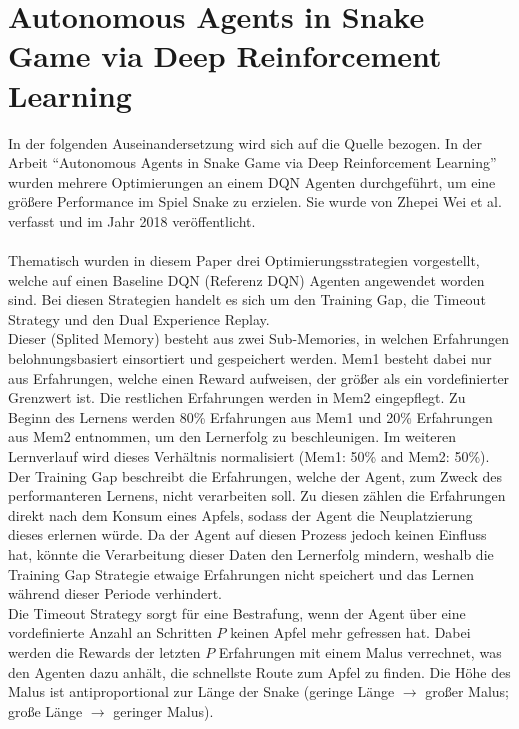 \section{Autonomous Agents in Snake Game via Deep Reinforcement Learning} \label{sec:Verwandte_Arbeiten_Paper_1}
In der folgenden Auseinandersetzung wird sich auf die Quelle \cite{Autonomous_Agents_in_Snake_Game_via_DRL} bezogen.
In der Arbeit "`Autonomous Agents in Snake Game via Deep Reinforcement Learning"' wurden mehrere Optimierungen an einem DQN Agenten durchgeführt, um eine größere Performance im Spiel Snake zu erzielen. Sie wurde von Zhepei Wei et al. verfasst und im Jahr 2018 veröffentlicht.\\
\\Thematisch wurden in diesem Paper drei Optimierungsstrategien vorgestellt, welche auf einen Baseline DQN (Referenz DQN) Agenten angewendet worden sind. Bei diesen Strategien handelt es sich um den Training Gap, die Timeout Strategy und den Dual Experience Replay.\\
Dieser (Splited Memory) besteht aus zwei Sub-Memories, in welchen Erfahrungen belohnungsbasiert einsortiert und gespeichert werden. Mem1 besteht dabei nur aus Erfahrungen, welche einen Reward aufweisen, der größer als ein vordefinierter Grenzwert ist. Die restlichen Erfahrungen werden in Mem2 eingepflegt. 
Zu Beginn des Lernens werden 80\% Erfahrungen aus Mem1 und 20\% Erfahrungen aus Mem2 entnommen, um den Lernerfolg zu beschleunigen. Im weiteren Lernverlauf wird dieses Verhältnis normalisiert (Mem1: 50\% and Mem2: 50\%).\\
Der Training Gap beschreibt die Erfahrungen, welche der Agent, zum Zweck des performanteren Lernens, nicht verarbeiten soll. Zu diesen zählen die Erfahrungen direkt nach dem Konsum eines Apfels, sodass der Agent die Neuplatzierung dieses erlernen würde. 
Da der Agent auf diesen Prozess jedoch keinen Einfluss hat, könnte die Verarbeitung dieser Daten den Lernerfolg mindern, weshalb die Training Gap Strategie etwaige Erfahrungen nicht speichert und das Lernen während dieser Periode verhindert.\\
Die Timeout Strategy sorgt für eine Bestrafung, wenn der Agent über eine vordefinierte Anzahl an Schritten $P$ keinen Apfel mehr gefressen hat. Dabei werden die Rewards der letzten $P$ Erfahrungen mit einem Malus verrechnet, was den Agenten dazu anhält, die schnellste Route zum Apfel zu finden. Die Höhe des Malus ist antiproportional zur Länge der Snake (geringe Länge $\rightarrow$ großer Malus; große Länge $\rightarrow$ geringer Malus).\\
